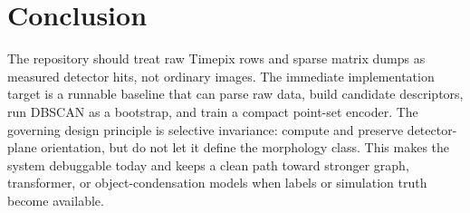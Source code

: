 \documentclass[11pt,a4paper]{article}
\begin{document}
\section{Conclusion}

The repository should treat raw Timepix rows and sparse matrix dumps as measured detector hits, not ordinary images. The immediate implementation target is a runnable baseline that can parse raw data, build candidate descriptors, run DBSCAN as a bootstrap, and train a compact point-set encoder. The governing design principle is selective invariance: compute and preserve detector-plane orientation, but do not let it define the morphology class. This makes the system debuggable today and keeps a clean path toward stronger graph, transformer, or object-condensation models when labels or simulation truth become available.



\end{document}
